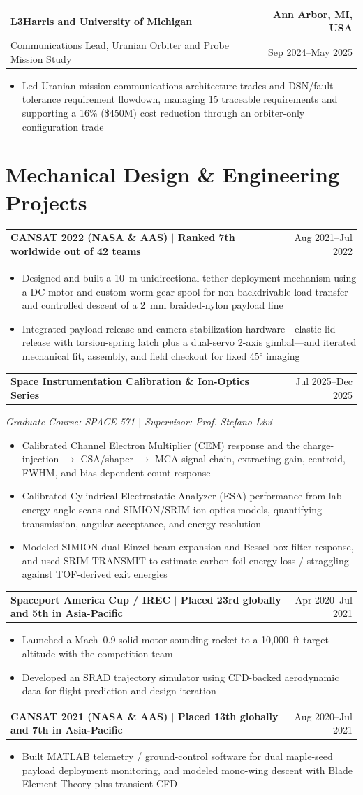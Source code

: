 \documentclass[10pt,a4paper]{article}
\makeatletter
\newcommand{\resumeSubheading}[4]{%
  \par\noindent\begin{tabular*}{\textwidth}{@{\extracolsep{\fill}}l r}
    \textbf{#1} & \textcolor{nameblue}{\textbf{#2}} \\
    #3 & #4
  \end{tabular*}\par\vspace{-1.6pt}%
}
\newcommand{\resumeProjectHeading}[2]{%
  \par\noindent\begin{tabular*}{\textwidth}{@{\extracolsep{\fill}}l r}
    \textbf{#1} & #2
  \end{tabular*}\par\vspace{-1.6pt}%
}
\newcommand{\resumeItemsStart}{\begin{itemize}}
\newcommand{\resumeItemsEnd}{\end{itemize}\vspace{-1.1pt}}
\newcommand{\resumeItem}[1]{\item #1}
\makeatother
\begin{document}
\resumeSubheading
  {L3Harris and University of Michigan}{Ann Arbor, MI, USA}
  {Communications Lead, Uranian Orbiter and Probe Mission Study}{Sep 2024--May 2025}
\resumeItemsStart
  \resumeItem{Led Uranian mission communications architecture trades and DSN/fault-tolerance requirement flowdown, managing 15 traceable requirements and supporting a 16\% (\$450M) cost reduction through an orbiter-only configuration trade}
\resumeItemsEnd

\section{Mechanical Design \& Engineering Projects}
\resumeProjectHeading{CANSAT 2022 (NASA \& AAS) $\mid$ Ranked 7th worldwide out of 42 teams}{Aug 2021--Jul 2022}
\resumeItemsStart
  \resumeItem{Designed and built a 10~m unidirectional tether-deployment mechanism using a DC motor and custom worm-gear spool for non-backdrivable load transfer and controlled descent of a 2~mm braided-nylon payload line}
  \resumeItem{Integrated payload-release and camera-stabilization hardware---elastic-lid release with torsion-spring latch plus a dual-servo 2-axis gimbal---and iterated mechanical fit, assembly, and field checkout for fixed 45$^{\circ}$ imaging}
\resumeItemsEnd

\resumeProjectHeading{Space Instrumentation Calibration \& Ion-Optics Series}{Jul 2025--Dec 2025}
{\itshape Graduate Course: SPACE 571 $\mid$ Supervisor: Prof. Stefano Livi}\vspace{-1.3pt}
\resumeItemsStart
  \resumeItem{Calibrated Channel Electron Multiplier (CEM) response and the charge-injection $\rightarrow$ CSA/shaper $\rightarrow$ MCA signal chain, extracting gain, centroid, FWHM, and bias-dependent count response}
  \resumeItem{Calibrated Cylindrical Electrostatic Analyzer (ESA) performance from lab energy-angle scans and SIMION/SRIM ion-optics models, quantifying transmission, angular acceptance, and energy resolution}
  \resumeItem{Modeled SIMION dual-Einzel beam expansion and Bessel-box filter response, and used SRIM TRANSMIT to estimate carbon-foil energy loss / straggling against TOF-derived exit energies}
\resumeItemsEnd

\resumeProjectHeading{Spaceport America Cup / IREC $\mid$ Placed 23rd globally and 5th in Asia-Pacific}{Apr 2020--Jul 2021}
\resumeItemsStart
  \resumeItem{Launched a Mach~0.9 solid-motor sounding rocket to a 10,000~ft target altitude with the competition team}
  \resumeItem{Developed an SRAD trajectory simulator using CFD-backed aerodynamic data for flight prediction and design iteration}
\resumeItemsEnd

\resumeProjectHeading{CANSAT 2021 (NASA \& AAS) $\mid$ Placed 13th globally and 7th in Asia-Pacific}{Aug 2020--Jul 2021}
\resumeItemsStart
  \resumeItem{Built MATLAB telemetry / ground-control software for dual maple-seed payload deployment monitoring, and modeled mono-wing descent with Blade Element Theory plus transient CFD}
\resumeItemsEnd
\end{document}
